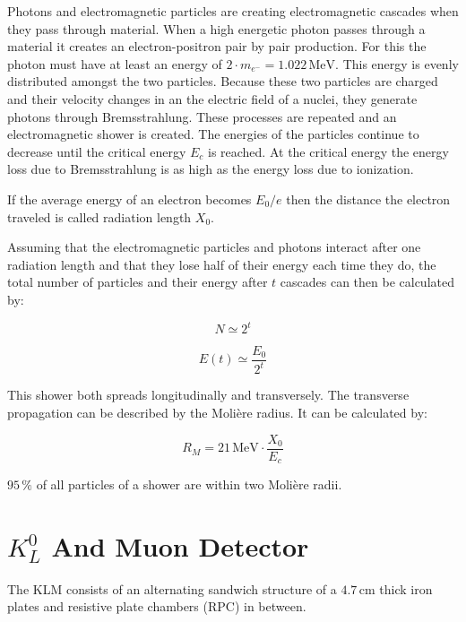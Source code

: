 \documentclass[a4paper,11pt,twosided,final,german,openbib,pdftex,listof=totoc,bibliography=totoc]{scrbook}
\begin{document}
Photons and electromagnetic particles are creating electromagnetic cascades when they pass through material.\cite{leo2012techniques} When a high energetic photon passes through a material it creates an electron-positron pair by pair production. For this the photon must have at least an energy of $2\cdot m_{e^{-}} = 1.022\,\textrm{MeV}$. This energy is evenly distributed amongst the two particles. Because these two particles are charged and their velocity changes in an the electric field of a nuclei, they generate photons through Bremsstrahlung. These processes are repeated and an electromagnetic shower is created. The energies of the particles continue to decrease until the critical energy $E_c$ is reached. At the critical energy the energy loss due to Bremsstrahlung is as high as the energy loss due to ionization.

If the average energy of an electron becomes ${E_0}/{e}$ then the distance the electron traveled is called radiation length $X_0$.

Assuming that the electromagnetic particles and photons interact after one radiation length and that they lose half of their energy each time they do, the total number of particles and their energy after $t$ cascades can then be calculated by:\cite{leo2012techniques}

\begin{equation}
	N \simeq 2^t
\end{equation}

\begin{equation}
	E(t) \simeq \frac{E_0}{2^t}
\end{equation}

This shower both spreads longitudinally and transversely. The transverse propagation can be described by the Moli\`ere radius. It can be calculated by:

\begin{equation}
	R_M=21\,\textrm{MeV}\cdot \frac{X_0}{E_c}
\end{equation}

$ 95\,\%$ of all particles of a shower are within two Moli\`ere radii.\cite{leo2012techniques}

\section{$K_L^0$ And Muon Detector }
\label{sec:KM}

The KLM consists of an alternating sandwich structure of a $4.7\,\textrm{cm}$ thick iron plates and resistive plate chambers (RPC) in between.
\end{document}
